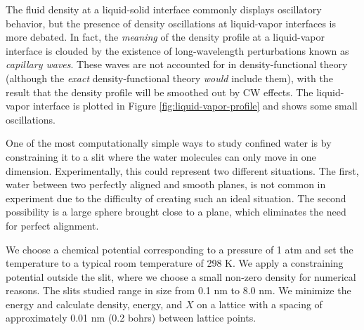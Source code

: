 \documentclass[letterpaper,twocolumn,amsmath,amssymb,prb]{revtex4-1}
\begin{document}
The fluid density at a liquid-solid interface commonly displays
oscillatory behavior, but the presence of density oscillations at
liquid-vapor interfaces is more debated\cite{penfold2001structure}.
In fact, the \emph{meaning} of the density profile at a liquid-vapor
interface is clouded by the existence of long-wavelength perturbations
known as \emph{capillary waves}.  These waves are not accounted for in
density-functional theory (although the \emph{exact}
density-functional theory \emph{would} include them), with the result
that the density profile will be smoothed out by CW effects. The liquid-vapor
interface is plotted in Figure \ref{fig:liquid-vapor-profile} and shows
some small oscillations.

One of the most computationally simple ways to study confined water is by
constraining it to a slit where the water molecules can only move in one
dimension. Experimentally, this could represent two different situations.
The first, water between two perfectly aligned and smooth planes, is not common 
in experiment due to the difficulty of creating such an ideal situation. The
second
possibility is a large sphere brought close to a plane, which eliminates the 
need for perfect alignment.

We choose a chemical potential corresponding to a pressure of 1 atm and set the
temperature to a typical room temperature of 298 K. We apply 
a constraining potential outside the slit, where we choose a small non-zero
density for numerical reasons. The slits studied range in size from 0.1 nm to 
8.0 nm. We minimize the energy and calculate density, energy, and $X$ on a
lattice
with a spacing of approximately 0.01 nm (0.2 bohrs) between lattice points.
\end{document}
